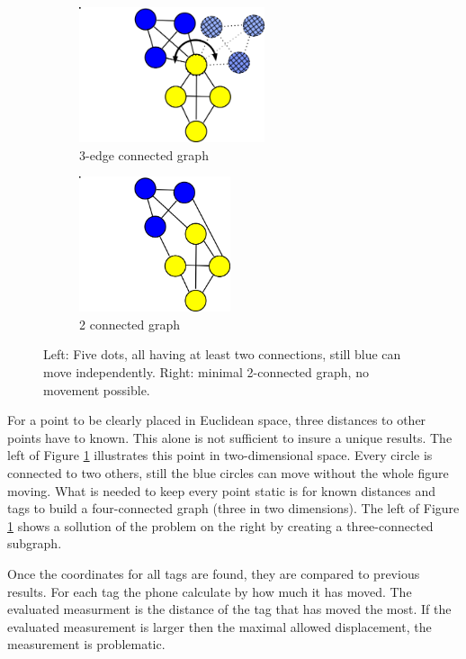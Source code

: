 \begin{figure}[ht!]
	\begin{subfigure}{.4\linewidth}
		\centering
		\includegraphics[height=150px]{graphics/schematics/connected_dots.png}
		\caption{3-edge connected graph}
	\end{subfigure}
\hspace{1cm}
	\begin{subfigure}{.4\linewidth}
		\centering
		\includegraphics[height=150px]{graphics/schematics/connected_dots_k_connected.png}
		\caption{2 connected graph}
	\end{subfigure}
	\caption{ Left: Five dots, all having at least two connections, still blue can move independently. Right: minimal 2-connected graph, no movement possible. }
	\label{f:connected_dots}
\end{figure}

For a point to be clearly placed in Euclidean space, three distances to other points have to known.
This alone is not sufficient to insure a unique results.
The left of Figure \ref{f:connected_dots} illustrates this point in two-dimensional space.
Every circle is connected to two others, still the blue circles can move without the whole figure moving.
What is needed to keep every point static is for known distances and tags to build a four-connected graph (three in two dimensions).
The left of Figure \ref{f:connected_dots} shows a sollution of the problem on the right by creating a three-connected subgraph.

Once the coordinates for all tags are found, they are compared to previous results.
For each tag the phone calculate by how much it has moved.
The evaluated measurment is the distance of the tag that has moved the most.
If the evaluated measurement is larger then the maximal allowed displacement, the measurement is problematic.



